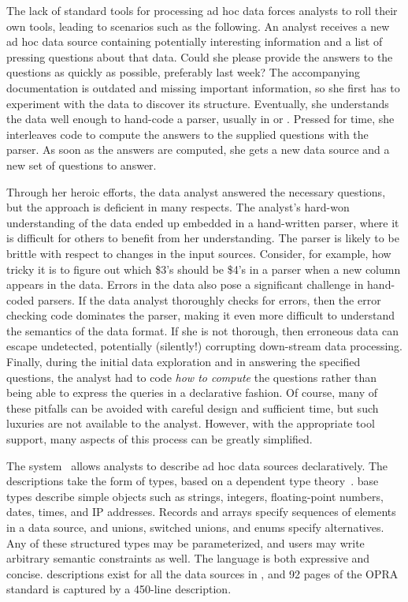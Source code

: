 The lack of standard tools for processing ad hoc data forces
analysts to roll their own tools, leading to scenarios such as the
following.  An analyst receives a new ad hoc data source containing
potentially interesting information and a list of pressing questions
about that data.  Could she please provide the answers to the
questions as quickly as possible, preferably last week?  The
accompanying documentation is outdated and missing important
information, so she first has to experiment with the data to discover
its structure.   Eventually, she understands the data well enough to hand-code a
parser, usually in \C{} or \perl{}.  Pressed for time, she interleaves
code to compute the answers to the supplied questions with the parser.
As soon as the answers are computed, she gets a new data source and a
new set of questions to answer.

Through her heroic efforts, the data analyst answered the necessary
questions, but the approach is deficient in many respects.  The
analyst's hard-won understanding of the data ended up embedded in a
hand-written parser, where it is difficult for others to benefit from
her understanding.  The parser is likely to be brittle with respect to
changes in the input sources.  Consider, for example, how tricky it is
to figure out which \$3's should be \$4's in a \perl{} parser when a
new column appears in the data.  Errors in the data also pose a
significant challenge in hand-coded parsers.  If the data analyst
thoroughly checks for errors, then the error checking code dominates
the parser, making it even more difficult to understand the semantics
of the data format.  If she is not thorough, then erroneous data can
escape undetected, potentially (silently!)  corrupting down-stream
data processing.  Finally, during the initial data exploration and in
answering the specified questions, the analyst had to code \textit{how
to compute} the questions rather than being able to express the
queries in a declarative fashion.  Of course, many of these pitfalls
can be avoided with careful design and sufficient time, but such
luxuries are not available to the analyst.  However, with the
appropriate tool support, many aspects of this process can be greatly
simplified.

The \pads{} system~\cite{fisher+:pldi05} allows analysts to describe
ad hoc data sources declaratively.  The descriptions take the form of
types, based on a dependent type theory~\cite{fisher+:popl06}.
\pads{} base types describe simple objects such as strings,
integers, floating-point numbers, dates, times, and IP addresses.
Records and arrays specify sequences of elements in a data source, and
unions, switched unions, and enums specify alternatives.  Any of these
structured types may be parameterized, and users may write arbitrary
semantic constraints as well.  The \pads{} language is both expressive
and concise.  \pads{} descriptions exist for all the data sources in
, and 92 pages of the OPRA standard is
captured by a 450-line \pads{} description.

